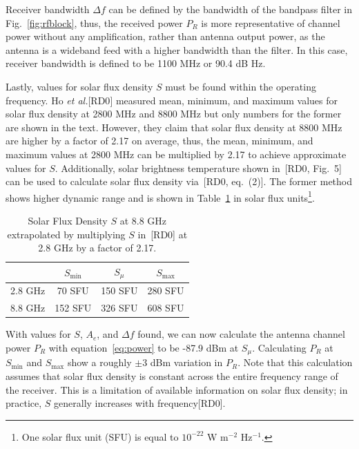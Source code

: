 \documentclass[titlepage]{article}
\newcommand{\nraocite}[1]{[RD0\cite{#1}]}
\newcommand{\nraoprecite}[2][]{[RD0\cite{#2}{, #1}]}
\begin{document}
Receiver bandwidth $\Delta f$ can be defined by the bandwidth of the bandpass filter in Fig.~\ref{fig:rfblock}, thus, the received power $P_R$ is more representative of channel power without any amplification, rather than antenna output power, as the antenna is a wideband feed with a higher bandwidth than the filter. In this case, receiver bandwidth is defined to be 1100 MHz or 90.4 dB Hz.

Lastly, values for solar flux density $S$ must be found within the operating frequency. Ho \textit{et al.}\nraocite{solartemp} measured mean, minimum, and maximum values for solar flux density at 2800 MHz and 8800 MHz but only numbers for the former are shown in the text. However, they claim that solar flux density at 8800 MHz are higher by a factor of 2.17 on average, thus, the mean, minimum, and maximum values at 2800 MHz can be multiplied by 2.17 to achieve approximate values for $S$. Additionally, solar brightness temperature shown in~\nraoprecite[Fig.~5]{solartemp} can be used to calculate solar flux density via~\nraoprecite[eq.~(2)]{solartemp}. The former method shows higher dynamic range and is shown in Table~\ref{tab:sfd} in solar flux units\footnote{One solar flux unit (SFU) is equal to $10^{-22}$ W m$^{-2}$ Hz$^{-1}$.}.
\begin{table}[!ht]
\centering
\begin{tabular}{c|c|c|c}
    & $S_{\min}$ & $S_{\mu}$ & $S_{\max}$ \\ \hline
    2.8 GHz & 70 SFU & 150 SFU & 280 SFU \\
    8.8 GHz & 152 SFU & 326 SFU & 608 SFU
\end{tabular}
\label{tab:sfd}
\caption{Solar Flux Density $S$ at 8.8 GHz extrapolated by multiplying $S$ in~\nraocite{solartemp} at 2.8 GHz by a factor of 2.17.}
\end{table}

With values for $S$, $A_e$, and $\Delta f$ found, we can now calculate the antenna channel power $P_R$ with equation~\ref{eq:power} to be -87.9 dBm at $S_{\mu}$. Calculating $P_R$ at $S_{\min}$ and $S_{\max}$ show a roughly $\pm$3 dBm variation in $P_R$. Note that this calculation assumes that solar flux density is constant across the entire frequency range of the receiver. This is a limitation of available information on solar flux density; in practice, $S$ generally increases with frequency\nraocite{sfd1986}.
\end{document}
